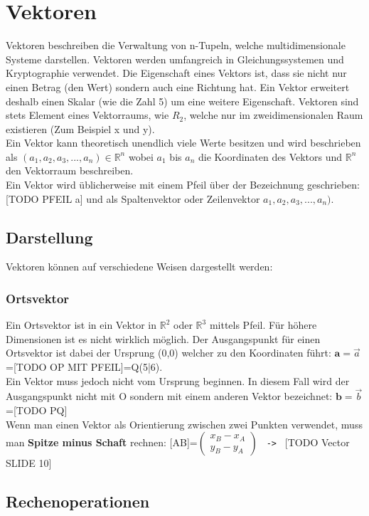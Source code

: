 \documentclass{article}
\newcommand{\R}{\mathbb{R}}
\begin{document}
	\section{Vektoren}
	Vektoren beschreiben die Verwaltung von n-Tupeln, welche multidimensionale Systeme darstellen. Vektoren werden umfangreich in Gleichungssystemen und Kryptographie verwendet. Die Eigenschaft eines Vektors ist, dass sie nicht nur einen Betrag (den Wert) sondern auch eine Richtung hat. Ein Vektor erweitert deshalb einen Skalar (wie die Zahl 5) um eine weitere Eigenschaft. Vektoren sind stets Element eines Vektorraums, wie $R_2$, welche nur im zweidimensionalen Raum existieren (Zum Beispiel x und y). \\
	Ein Vektor kann theoretisch unendlich viele Werte besitzen und wird beschrieben als $(a_1,a_2,a_3,...,a_n)\in \R^n$ wobei $a_1$ bis $a_n$ die Koordinaten des Vektors und $\R^n$ den Vektorraum beschreiben. \\
	Ein Vektor wird üblicherweise mit einem Pfeil über der Bezeichnung geschrieben: [TODO PFEIL a] und als Spaltenvektor oder Zeilenvektor $a_1,a_2,a_3,...,a_n)$. \\
	\subsection{Darstellung}
	Vektoren können auf verschiedene Weisen dargestellt werden:
	\subsubsection{Ortsvektor}
	Ein Ortsvektor ist in ein Vektor in $\R^2$ oder $\R^3$ mittels Pfeil. Für höhere Dimensionen ist es nicht wirklich möglich. Der Ausgangspunkt für einen Ortsvektor ist dabei der Ursprung (0,0) welcher zu den Koordinaten führt: $\textbf{a}=\vec{a}$=[TODO OP MIT PFEIL]=Q(5|6). \\
	Ein Vektor muss jedoch nicht vom Ursprung beginnen. In diesem Fall wird der Ausgangspunkt nicht mit O sondern mit einem anderen Vektor bezeichnet: $\textbf{b}=\vec{b}$=[TODO PQ] \\
	Wenn man einen Vektor als Orientierung zwischen zwei Punkten verwendet, muss man \textbf{Spitze minus Schaft} rechnen: [AB]=$\begin{pmatrix}x_B-x_A \\ y_B-y_A \end{pmatrix}$ \texttt{ -> } [TODO Vector SLIDE 10]
	\subsection{Rechenoperationen}
\end{document}
